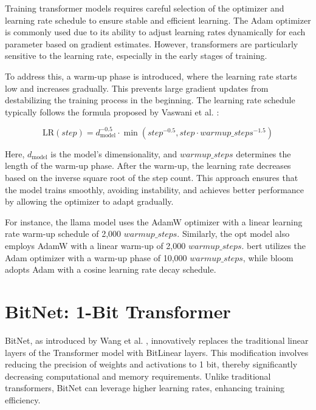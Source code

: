 Training transformer models requires careful selection of the optimizer and learning rate schedule to ensure stable and efficient learning. The Adam \cite{adam} optimizer is commonly used due to its ability to adjust learning rates dynamically for each parameter based on gradient estimates. However, transformers are particularly sensitive to the learning rate, especially in the early stages of training.

To address this, a warm-up phase is introduced, where the learning rate starts low and increases gradually. This prevents large gradient updates from destabilizing the training process in the beginning. The learning rate schedule typically follows the formula proposed by Vaswani et al. \cite{transformer}:

\begin{equation}
\text{LR}(step) = d_{\text{model}}^{-0.5} \cdot \min(step^{-0.5}, step \cdot warmup\_steps^{-1.5})
\end{equation}

Here, $d_{\text{model}}$ is the model’s dimensionality, and $warmup\_steps$ determines the length of the warm-up phase. After the warm-up, the learning rate decreases based on the inverse square root of the step count. This approach ensures that the model trains smoothly, avoiding instability, and achieves better performance by allowing the optimizer to adapt gradually.

For instance, the \gls{llama} \cite{llama} model uses the AdamW optimizer with a linear learning rate warm-up schedule of 2,000 \(warmup\_steps\). Similarly, the \gls{opt} \cite{opt} model also employs AdamW with a linear warm-up of 2,000 \(warmup\_steps\). \gls{bert} \cite{bert} utilizes the Adam optimizer with a warm-up phase of 10,000 \(warmup\_steps\), while \gls{bloom} \cite{bloom} adopts Adam with a cosine learning rate decay schedule.


\section{BitNet: 1-Bit Transformer}
\label{sect:bitnet}

BitNet, as introduced by Wang et al. \cite{BitNet2023}, innovatively replaces the traditional linear layers of the Transformer model with BitLinear layers. This modification involves reducing the precision of weights and activations to 1 bit, thereby significantly decreasing computational and memory requirements. Unlike traditional transformers, BitNet can leverage higher learning rates, enhancing training efficiency.

